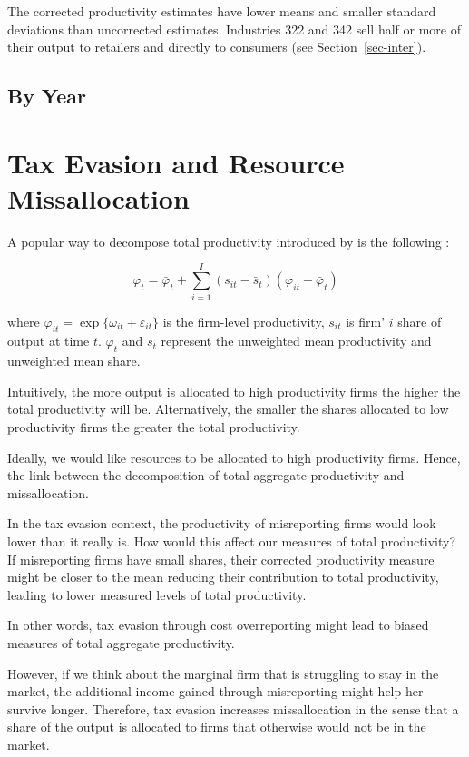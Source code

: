 \documentclass[
  12pt]{article}
\theoremstyle{definition}
\theoremstyle{remark}
\begin{document}
The corrected productivity estimates have lower means and smaller
standard deviations than uncorrected estimates. Industries 322 and 342
sell half or more of their output to retailers and directly to consumers
(see Section~\ref{sec-inter}).

\subsection{By Year}\label{by-year}

\section{Tax Evasion and Resource
Missallocation}\label{tax-evasion-and-resource-missallocation}

A popular way to decompose total productivity introduced by
\citet{Olley1996} is the following :

\[
\varphi_t = \bar\varphi_t + \sum_{i=1}^I \left(s_{it}-\bar s_{t}\right)\left(\varphi_{it}-\bar\varphi_t\right)
\]

where \(\varphi_{it}=\exp\{\omega_{it}+\varepsilon_{it}\}\) is the
firm-level productivity, \(s_{it}\) is firm' \(i\) share of output at
time \(t\). \(\bar\varphi_t\) and \(\bar s_t\) represent the unweighted
mean productivity and unweighted mean share.

Intuitively, the more output is allocated to high productivity firms the
higher the total productivity will be. Alternatively, the smaller the
shares allocated to low productivity firms the greater the total
productivity.

Ideally, we would like resources to be allocated to high productivity
firms. Hence, the link between the decomposition of total aggregate
productivity and missallocation.

In the tax evasion context, the productivity of misreporting firms would
look lower than it really is. How would this affect our measures of
total productivity? If misreporting firms have small shares, their
corrected productivity measure might be closer to the mean reducing
their contribution to total productivity, leading to lower measured
levels of total productivity.

In other words, tax evasion through cost overreporting might lead to
biased measures of total aggregate productivity.

However, if we think about the marginal firm that is struggling to stay
in the market, the additional income gained through misreporting might
help her survive longer. Therefore, tax evasion increases missallocation
in the sense that a share of the output is allocated to firms that
otherwise would not be in the market.
\end{document}
